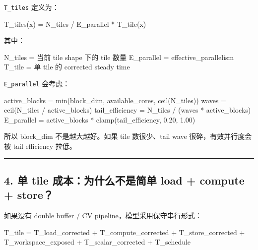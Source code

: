\documentclass[
  10pt,
]{article}
\newenvironment{Shaded}{}{}
\newcommand{\NormalTok}[1]{#1}
\begin{document}
\texttt{T\_tiles} 定义为：

\begin{Shaded}
\begin{Highlighting}[]
\NormalTok{T\_tiles(x) = N\_tiles / E\_parallel * T\_tile(x)}
\end{Highlighting}
\end{Shaded}

其中：

\begin{Shaded}
\begin{Highlighting}[]
\NormalTok{N\_tiles      = 当前 tile shape 下的 tile 数量}
\NormalTok{E\_parallel   = effective\_parallelism}
\NormalTok{T\_tile       = 单 tile 的 corrected steady time}
\end{Highlighting}
\end{Shaded}

\texttt{E\_parallel} 会考虑：

\begin{Shaded}
\begin{Highlighting}[]
\NormalTok{active\_blocks = min(block\_dim, available\_cores, ceil(N\_tiles))}
\NormalTok{waves = ceil(N\_tiles / active\_blocks)}
\NormalTok{tail\_efficiency = N\_tiles / (waves * active\_blocks)}
\NormalTok{E\_parallel = active\_blocks * clamp(tail\_efficiency, 0.20, 1.00)}
\end{Highlighting}
\end{Shaded}

所以 block\_dim 不是越大越好。如果 tile 数很少、tail wave
很碎，有效并行度会被 tail efficiency 拉低。

\begin{center}\rule{0.5\linewidth}{0.5pt}\end{center}

\subsection{4. 单 tile 成本：为什么不是简单 load + compute +
store？}\label{ux5355-tile-ux6210ux672cux4e3aux4ec0ux4e48ux4e0dux662fux7b80ux5355-load-compute-store}

如果没有 double buffer / CV pipeline，模型采用保守串行形式：

\begin{Shaded}
\begin{Highlighting}[]
\NormalTok{T\_tile =}
\NormalTok{    T\_load\_corrected}
\NormalTok{  + T\_compute\_corrected}
\NormalTok{  + T\_store\_corrected}
\NormalTok{  + T\_workspace\_exposed}
\NormalTok{  + T\_scalar\_corrected}
\NormalTok{  + T\_schedule}
\end{Highlighting}
\end{Shaded}
\end{document}
